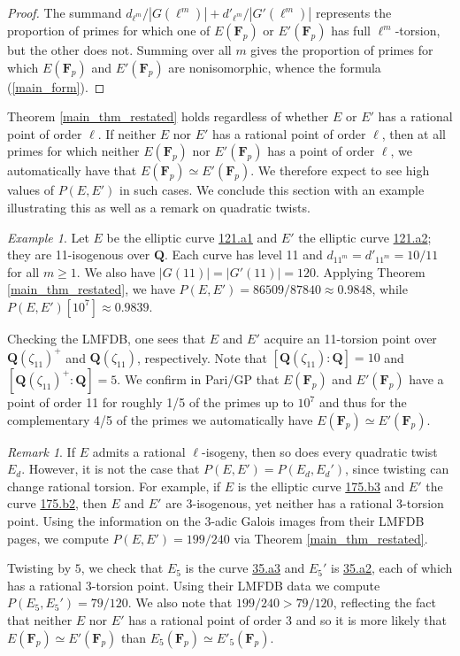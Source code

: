 \documentclass{amsart}
\newcommand{\F}{\mathbf{F}}
\newcommand{\Q}{\mathbf{Q}}
\numberwithin{equation}{section}
\theoremstyle{plain}
\theoremstyle{remark}
\newtheorem{rmk}[equation]{Remark}
\newtheorem{exm}[equation]{Example}
\begin{document}
\begin{proof}
The summand $d_{\ell^m}/|G(\ell^m)| + d'_{\ell^m}/|G'(\ell^m)|$ represents the proportion of primes for which one of $E(\F_p)$ or $E'(\F_p)$ has full $\ell^m$-torsion, but the other does not.  Summing over all $m$ gives the proportion of primes for which $E(\F_p)$ and $E'(\F_p)$ are nonisomorphic, whence the formula (\ref{main_form}).
\end{proof}

Theorem \ref{main_thm_restated} holds regardless of whether $E$ or $E'$ has a rational point of order $\ell$.  If neither $E$ nor $E'$ has a rational point of order $\ell$, then at all primes for which neither $E(\F_p)$ nor $E'(\F_p)$ has a point of order $\ell$, we automatically have that $E(\F_p) \simeq E'(\F_p)$.  We therefore expect to see high values of $P(E,E')$ in such cases.  We conclude this section with an example illustrating this as well as a remark on quadratic twists.

\begin{exm}
Let $E$ be the elliptic curve \href{https://beta.lmfdb.org/EllipticCurve/Q/121/a/1}{121.a1} and $E'$ the elliptic curve \href{https://beta.lmfdb.org/EllipticCurve/Q/121/a/2}{121.a2}; they are 11-isogenous over $\Q$.  Each curve has level 11 and $d_{11^m} = d'_{11^m} = 10/11$ for all $m \geq 1$.  We also have $|G(11)| = |G'(11)| = 120$.  Applying Theorem \ref{main_thm_restated}, we have $P(E,E') = 86509/87840 \approx 0.9848$, while $P(E,E')[10^7] \approx 0.9839$.  

Checking the LMFDB, one sees that $E$ and $E'$ acquire an 11-torsion point over $\Q(\zeta_{11})^+$ and $\Q(\zeta_{11})$, respectively.  Note that $[\Q(\zeta_{11}):\Q] = 10$ and $[\Q(\zeta_{11})^+:\Q] = 5$.  We confirm in Pari/GP that $E(\F_p)$ and $E'(\F_p)$ have a point of order 11 for roughly 1/5 of the primes up to $10^7$ and thus  for the complementary 4/5 of the primes we automatically have $E(\F_p) \simeq E'(\F_p)$.
\end{exm}

\begin{rmk}
If $E$ admits a rational $\ell$-isogeny, then so does every quadratic twist $E_d$.  However, it is not the case that $P(E,E') = P(E_d,E_d')$, since twisting can change rational torsion.  For example, if $E$ is the elliptic curve \href{https://beta.lmfdb.org/EllipticCurve/Q/175/b/3}{175.b3} and $E'$ the curve \href{https://beta.lmfdb.org/EllipticCurve/Q/175/b/2}{175.b2}, then $E$ and $E'$ are 3-isogenous, yet neither has a rational 3-torsion point.  Using the information on the $3$-adic Galois images from their LMFDB pages, we compute $P(E,E') = 199/240$ via Theorem \ref{main_thm_restated}.

Twisting by $5$, we check that $E_5$ is the curve \href{https://beta.lmfdb.org/EllipticCurve/Q/35/a/3}{35.a3} and $E_5'$ is \href{https://beta.lmfdb.org/EllipticCurve/Q/35/a/2}{35.a2}, each of which has a rational 3-torsion point.  Using their LMFDB data we compute $P(E_5,E_5') = 79/120$.  We also note that $199/240 > 79/120$, reflecting the fact that neither $E$ nor $E'$ has a rational point of order 3 and so it is more likely that $E(\F_p) \simeq E'(\F_p)$ than $E_5(\F_p) \simeq E'_5(\F_p)$.
\end{rmk}
\end{document}
